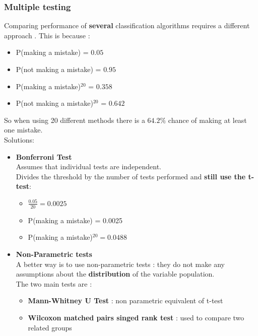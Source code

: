 \subsubsection{Multiple testing}
Comparing performance of \textbf{several} classification algorithms requires a different approach . This is because :
\begin{itemize}
\item P(making a mistake) = $0.05$
\item P(not making a mistake) = $0.95$
\item P(making a mistake)$^{20}$  = $0.358$
\item P(not making a mistake)$^{20}$ = $0.642$
\end{itemize}
So when using 20 different methods there is a $64.2 \%$ chance of making at least one mistake.\\
Solutions:
\begin{itemize}

\item \textbf{Bonferroni Test}\\
Assumes that individual tests are independent.\\
Divides the threshold by the number of tests performed and \textbf{still use the t-test}:
\begin{itemize}
\item $\frac{0.05}{20} = 0.0025$
\item P(making a mistake) = 0.0025
\item P(making a mistake)$^{20}=0.0488$ 
\end{itemize}

\item \textbf{Non-Parametric tests}\\
A better way is to use non-parametric tests : they do not make any assumptions about the \textbf{distribution} of the variable population.\\
The two main tests are :
\begin{itemize}
\item \textbf{Mann-Whitney U Test} : non parametric equivalent of t-test
\item \textbf{Wilcoxon matched pairs singed rank test} : used to compare two related groups
\end{itemize}
\end{itemize}

